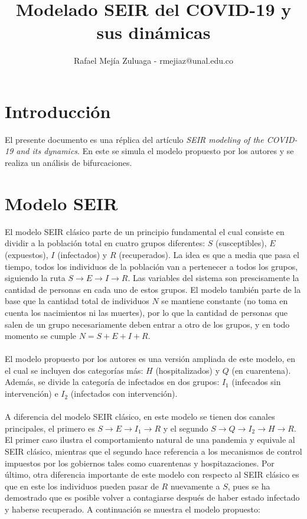 \documentclass[conference]{IEEEtran}
\begin{document}
    

\title{Modelado SEIR del COVID-19 y sus dinámicas}

\author{Rafael Mejía Zuluaga - rmejiaz@unal.edu.co}

\maketitle


\section{Introducción}

El presente documento es una réplica del artículo \textit{SEIR modeling of the
COVID-19 and its dynamics}. En este se simula el modelo propuesto por los autores 
y se realiza un análisis de bifurcaciones.

\section{Modelo SEIR}

El modelo SEIR clásico parte de un principio fundamental el cual consiste en dividir a
la población total en cuatro grupos diferentes: $S$ (susceptibles), $E$ (expuestos),
$I$ (infectados) y $R$ (recuperados). La idea es que a media que pasa el tiempo, 
todos los individuos de la población van a pertenecer a todos los grupos, siguiendo la 
ruta $S \rightarrow E \rightarrow I \rightarrow R$. Las variables del sistema son
prescisamente la cantidad de personas en cada uno de estos grupos. El modelo también 
parte de la base que la cantidad total de individuos $N$ se mantiene constante (no toma en
cuenta los nacimientos ni las muertes), por lo que la cantidad de personas que salen de
un grupo necesariamente deben entrar a otro de los grupos, y en todo momento se cumple
$N = S + E + I + R$.
\\\\
El modelo propuesto por los autores es una versión ampliada de este modelo, en el cual 
se incluyen dos categorías más: $H$ (hospitalizados) y $Q$ (en cuarentena). Además, se
divide la categoría de infectados en dos grupos: $I_1$ (infecados sin intervención)
e $I_2$ (infectados con intervención).
\\\\
A diferencia del modelo SEIR clásico, en este modelo se tienen dos canales principales,
el primero es $S \rightarrow E \rightarrow I_1 \rightarrow R$ y el segundo
$S \rightarrow Q \rightarrow I_2 \rightarrow H \rightarrow R$. El primer 
caso ilustra el comportamiento natural de una pandemia y equivale al SEIR clásico, 
mientras que el segundo hace referencia a los mecanismos de control impuestos por los
gobiernos tales como cuarentenas y hospitazaciones. Por último, otra diferencia 
importante de este modelo con respecto al SEIR clásico es que en este los individuos
pueden pasar de $R$ nuevamente a $S$, pues se ha demostrado que es posible volver a 
contagiarse después de haber estado infectado y haberse recuperado. A continuación 
se muestra el modelo propuesto:
\end{document}
